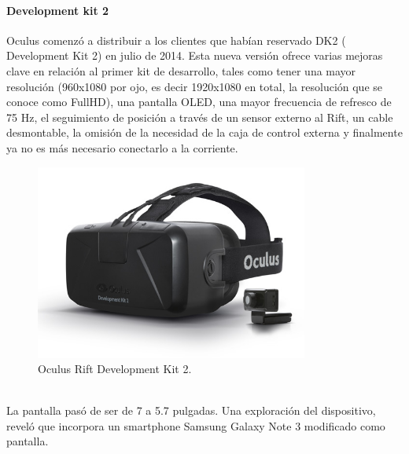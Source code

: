 \documentclass[12pt]{article}
\begin{document}
\paragraph{Development kit 2}
Oculus comenzó a distribuir a los clientes que habían reservado DK2 ( Development Kit 2) en julio de 2014. Esta nueva versión ofrece varias mejoras clave en relación al primer kit de desarrollo, tales como tener una mayor resolución (960x1080 por ojo, es decir 1920x1080 en total, la resolución que se conoce como FullHD), una pantalla OLED, una mayor frecuencia de refresco de 75 Hz, el seguimiento de posición a través de un sensor externo al Rift, un cable desmontable,  la omisión de la necesidad de la caja de control externa y finalmente ya no es más necesario conectarlo a la corriente.
\begin{figure}[h!]
\includegraphics[width=0.8\textwidth,center]{dk2.jpg}
\caption{Oculus Rift Development Kit 2.}
\end{figure}
\\La pantalla pasó de ser de 7 a 5.7 pulgadas. Una exploración del dispositivo, reveló que incorpora un smartphone Samsung Galaxy Note 3 modificado como pantalla.
\end{document}

